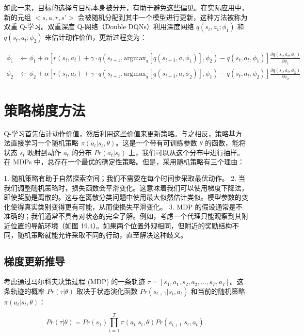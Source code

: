 如此一来，目标的选择与目标本身被分开，有助于避免这些偏见。在实际应用中，新的元组 \(<s, a, r, s'>\) 会被随机分配到其中一个模型进行更新，这种方法被称为双重 Q-学习。双重深度 Q-网络（Double DQNs）利用深度网络 \(q(s_t, a_t; \phi_1)\) 和 \(q(s_t, a_t; \phi_2)\) 来估计动作价值，更新过程变为：

\[
\begin{aligned}
\phi_1 &\leftarrow \phi_1 + \alpha \left[ r(s_t, a_t) + \gamma \cdot q \left( s_{t+1}, \text{argmax}_a [q(s_{t+1}, a, \phi_1)], \phi_2 \right) - q(s_t, a_t, \phi_1) \right] \frac{\partial q(s_t, a_t, \phi_1)}{\partial \phi_1} \\
\phi_2 &\leftarrow \phi_2 + \alpha \left[ r(s_t, a_t) + \gamma \cdot q \left( s_{t+1}, \text{argmax}_a [q(s_{t+1}, a, \phi_2)], \phi_1 \right) - q(s_t, a_t, \phi_2) \right] \frac{\partial q(s_t, a_t, \phi_2)}{\partial \phi_2}
\end{aligned} \tag{19.21}
\]


\section{策略梯度方法}
Q-学习首先估计动作价值，然后利用这些价值来更新策略。与之相反，策略基方法直接学习一个随机策略 \(\pi(a_t|s_t, \theta)\)。这是一个带有可训练参数 \(\theta\) 的函数，能将状态 \(s_t\) 映射到动作 \(a_t\) 的分布 \(Pr(a_t|s_t)\) 上，我们可以从这个分布中进行抽样。在 MDPs 中，总存在一个最优的确定性策略。但是，采用随机策略有三个理由：

1. 随机策略有助于自然探索空间；我们不需要在每个时间步采取最优动作。
2. 当我们调整随机策略时，损失函数会平滑变化。这意味着我们可以使用梯度下降法，即使奖励是离散的。这与在离散分类问题中使用最大似然估计类似。模型参数的变化使得真实类别变得更有可能，从而使损失平滑变化。
3. MDP 的假设通常是不准确的；我们通常不具有对状态的完全了解。例如，考虑一个代理只能观察到其附近位置的导航环境（如图 19.4）。如果两个位置外观相同，但附近的奖励结构不同，随机策略就能允许采取不同的行动，直至解决这种歧义。


\subsection{梯度更新推导}
考虑通过马尔科夫决策过程 (MDP) 的一条轨迹 \(\tau = [s_1, a_1, s_2, a_2, ..., s_T, a_T]\)。这条轨迹的概率 \(Pr(\tau|\theta)\) 取决于状态演化函数 \(Pr(s_{t+1}|s_t, a_t)\) 和当前的随机策略 \(\pi(a_t|s_t, \theta)\)：

\[
Pr(\tau|\theta) = Pr(s_1) \prod_{t=1}^{T} \pi(a_t|s_t, \theta)Pr(s_{t+1}|s_t, a_t). \tag{19.22}
\]

